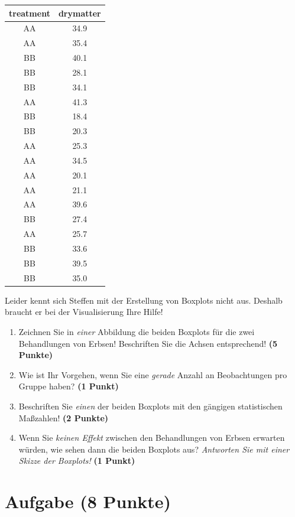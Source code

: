\documentclass[a4paper, 9pt]{scrartcl}\usepackage[]{graphicx}\usepackage[]{xcolor}
\begin{document}
\begin{table}[!h]
\centering
\begin{tabular}{cc}
\toprule
treatment & drymatter\\
\midrule
AA & 34.9\\
AA & 35.4\\
BB & 40.1\\
BB & 28.1\\
BB & 34.1\\
\addlinespace
AA & 41.3\\
BB & 18.4\\
BB & 20.3\\
AA & 25.3\\
AA & 34.5\\
\addlinespace
AA & 20.1\\
AA & 21.1\\
AA & 39.6\\
BB & 27.4\\
AA & 25.7\\
\addlinespace
BB & 33.6\\
BB & 39.5\\
BB & 35.0\\
\bottomrule
\end{tabular}
\end{table}



Leider kennt sich Steffen mit der Erstellung von Boxplots nicht aus. Deshalb braucht er bei der Visualisierung Ihre Hilfe!

\begin{enumerate}
\item Zeichnen Sie in \textit{einer} Abbildung die beiden Boxplots für die zwei Behandlungen von Erbsen! Beschriften Sie die Achsen entsprechend! \textbf{(5 Punkte)} 
\item Wie ist Ihr Vorgehen, wenn Sie eine \textit{gerade} Anzahl an
  Beobachtungen pro Gruppe haben? \textbf{(1 Punkt)}
\item Beschriften Sie \textit{einen} der beiden Boxplots mit den gängigen
  statistischen Maßzahlen! \textbf{(2 Punkte)}
\item Wenn Sie \textit{keinen Effekt} zwischen den Behandlungen von
  Erbsen erwarten würden, wie sehen dann die beiden Boxplots aus?
  \textit{Antworten Sie mit einer Skizze der Boxplots!}
  \textbf{(1 Punkt)}
\end{enumerate} 
\clearpage

\section{Aufgabe \hfill (8 Punkte)}
\end{document}

